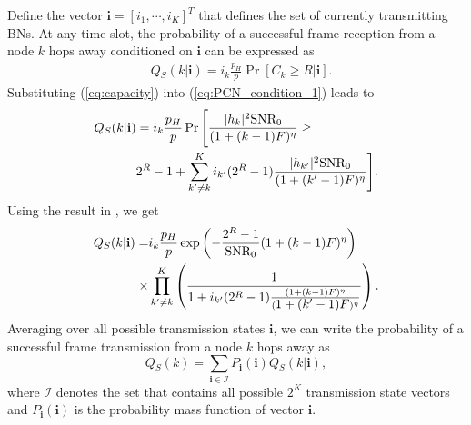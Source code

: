 \documentclass[10pt,english,two column]{IEEEtran}
\begin{document}
Define the vector $\mathbf{i}=[i_{1},\cdots,i_{K}]^{T}$ that defines
the set of currently transmitting BNs. At any time slot, the probability
of a successful frame reception from a node $k$ hops away conditioned
on $\mathbf{i}$ can be expressed as
\begin{align}
 & Q{}_{S}(k|\mathbf{i})=i_{k}\frac{p_{H}}{p}\Pr\left[C_{k}\geq R|\mathbf{i}\right].\label{eq:PCN_condition_1}
\end{align}
Substituting (\ref{eq:capacity}) into (\ref{eq:PCN_condition_1})
leads to
\begin{align}
Q{}_{S}(k|\mathbf{i}) & =i_{k}\frac{p_{H}}{p}\Pr\Bigg[\frac{|h_{k}|^{2}\mathrm{SNR_{0}}}{(1+(k-1)F)^{\eta}}\geq\nonumber \\
 & 2^{R}-1+\sum_{k'\neq k}^{K}i_{k'}(2^{R}-1)\mathrm{\frac{\mbox{\ensuremath{|h_{k'}|^{2}}}SNR_{0}}{(\mbox{\ensuremath{1+(k'-1)F}})^{\eta}}\Bigg]}.\label{eq:PCN_condition_2}
\end{align}
 Using the result in \cite{Boyd}, we get
\begin{align}
Q{}_{S}(k|\mathbf{i})= & i_{k}\frac{p_{H}}{p}\exp\left(-\frac{2^{R}-1}{\mathrm{SNR_{0}}}(1+(k-1)F)^{\eta}\right)\nonumber \\
\times & \prod_{k'\neq k}^{K}\left(\frac{1}{1+i_{k'}(2^{R}-1)\frac{(1+(k-1)F)^{\eta}}{(\mbox{\ensuremath{1+(k'-1)F}})^{\eta}}}\right).\label{eq:PCN_condition}
\end{align}
Averaging over all possible transmission states $\mathbf{i}$, we
can write the probability of a successful frame transmission from
a node $k$ hops away as
\begin{equation}
Q{}_{S}(k)=\sum_{\mathbf{i}\in\mathbf{\mathbf{\mathcal{I}}}}P_{\boldsymbol{\mathbf{i}}}\left(\mathbf{i}\right)Q{}_{S}(k|\mathbf{i}),\label{eq:PCN_inter}
\end{equation}
where $\mathbf{\mathcal{I}}$ denotes the set that contains all possible
$2^{K}$ transmission state vectors and $P_{\mathbf{\mathbf{i}}}\left(\mathbf{i}\right)$
is the probability mass function of vector $\mathbf{\mathbf{i}}$.
\end{document}
